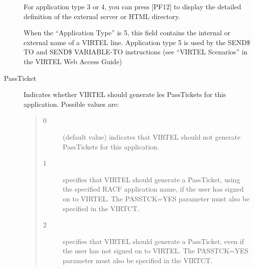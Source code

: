 \documentclass[letterpaper,10pt,english]{sphinxmanual}
\begin{document}
\begin{description}
\begin{quote}
\begin{description}
\end{description}
\end{quote}

For application type 3 or 4, you can press {[}PF12{]} to display the detailed definition of the external server or HTML directory.

When the “Application Type” is 5, this field contains the internal or external name of a VIRTEL line. Application type 5 is used by the SEND\$ TO and SEND\$ VARIABLE-TO instructions (see “VIRTEL Scenarios” in the VIRTEL Web Access Guide)

\item[{PassTicket}] \leavevmode
Indicates whether VIRTEL should generate les PassTickets for this application. Possible values are:
\begin{quote}
\begin{description}
\item[{0}] \leavevmode
(default value) indicates that VIRTEL should not generate PassTickets for this application.

\item[{1}] \leavevmode
specifies that VIRTEL should generate a PassTicket, using the specified RACF application name, if the user has signed on to VIRTEL. The PASSTCK=YES parameter must also be specified in the VIRTCT.

\item[{2}] \leavevmode
specifies that VIRTEL should generate a PassTicket, even if the user has not signed on to VIRTEL. The PASSTCK=YES parameter must also be specified in the VIRTCT.

\end{description}
\end{quote}

\end{description}
\end{document}
